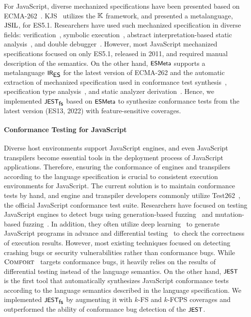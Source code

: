 
For JavaScript, diverse mechanized specifications have
been presented based on ECMA-262~\cite{es13}.
%
KJS~\cite{kjs} utilizes the $\mathbb{K}$ framework, and \citet{javert}
presented a metalanguage, $\text{JSIL}$, for ES5.1.
%
Researchers have used such mechanized specification in diverse fields:
verification~\cite{javert}, symbolic execution~\cite{javert2}, abstract
interpretation-based static analysis~\cite{wala, tajs, jsai, safe, safe2}, and
double debugger~\cite{jsexplain}.
%
However, most JavaScript mechanized specifications focused on only ES5.1,
released in 2011, and required manual description of the semantics.
%
On the other hand, $\textsf{\small ESMeta}$ supports a metalanguage $\textsf{\small IR}_{\textsf{\small ES}}$ for the latest
version of ECMA-262 and the automatic extraction of mechanized specification
used in conformance test synthesis~\cite{jest}, specification type
analysis~\cite{jstar}, and static analyzer derivation~\cite{jsaver}.
%
Hence, we implemented $\textsf{\small JEST}_{\textsf{\small fs}}$ based on $\textsf{\small ESMeta}$ to synthesize conformance tests
from the latest version (ES13, 2022) with feature-sensitive coverages.


\paragraph{\textbf{Conformance Testing for JavaScript}}
%
Diverse host environments support JavaScript engines, and even JavaScript
transpilers become essential tools in the deployment process of JavaScript
applications.
%
Therefore, ensuring the conformance of engines and transpilers according to the
language specification is crucial to consistent execution environments for
JavaScript.
%
The current solution is to maintain conformance tests by hand, and engine and
transpiler developers commonly utilize Test262~\cite{test262}, the official
JavaScript conformance test suite.
%
Researchers have focused on testing JavaScript engines to detect bugs using
generation-based fuzzing~\cite{codealchemist, favocado, sofi} and
mutation-based fuzzing~\cite{die, ifuzzer, superion}.
%
In addition, they often utilize deep learning~\cite{montage, comfort} to
generate JavaScript programs in advance and differential
testing~\cite{jit-picking} to check the correctness of execution results.
%
However, most existing techniques focused on detecting crashing bugs or security
vulnerabilities rather than conformance bugs.
%
While $\textsc{Comfort}$~\cite{comfort} targets conformance bugs, it heavily relies on
the results of differential testing instead of the language semantics.
%
On the other hand, $\textsf{\small JEST}$~\cite{jest} is the first tool that automatically
synthesizes JavaScript conformance tests according to the language semantics
described in the language specification.
%
We implemented $\textsf{\small JEST}_{\textsf{\small fs}}$ by augmenting it with $k$-FS and $k$-FCPS coverages and
outperformed the ability of conformance bug detection of the $\textsf{\small JEST}$.
